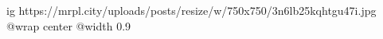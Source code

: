  
 
 
 
 

\ifcmt
  ig https://mrpl.city/uploads/posts/resize/w/750x750/3n6lb25kqhtgu47i.jpg
  @wrap center
  @width 0.9
\fi
